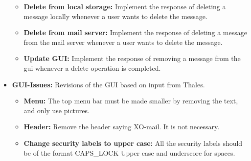 \begin{itemize}
\begin{itemize}
\item{}\textbf{Delete from local storage:} Implement the response of deleting a message locally whenever a user wants to delete the message.
\item{}\textbf{Delete from mail server:} Implement the response of deleting a message from the mail server whenever a user wants to delete the message.
\item{}\textbf{Update GUI:} Implement the response of removing a message from the gui whenever a delete operation is completed. 
\end{itemize}
\item{}\textbf{GUI-Issues:} Revisions of the GUI based on input from Thales.
\begin{itemize}
\item{}\textbf{Menu:} The top menu bar must be made smaller by removing the text, and only use pictures.
\item{}\textbf{Header:} Remove the header saying XO-mail. It is not necessary.
\item{}\textbf{Change security labels to upper case:} All the security labels should be of the format CAPS\_LOCK Upper case and underscore for spaces.
\end{itemize}
\end{itemize}

